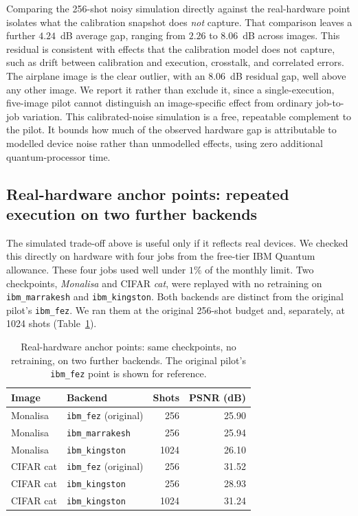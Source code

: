 \documentclass[pdflatex,sn-basic]{sn-jnl}
\begin{document}
Comparing the 256-shot noisy simulation directly against the real-hardware point isolates what the calibration snapshot does \emph{not} capture.
That comparison leaves a further $4.24$~dB average gap, ranging from $2.26$ to $8.06$~dB across images.
This residual is consistent with effects that the calibration model does not capture, such as drift between calibration and execution, crosstalk, and correlated errors.
The airplane image is the clear outlier, with an $8.06$~dB residual gap, well above any other image.
We report it rather than exclude it, since a single-execution, five-image pilot cannot distinguish an image-specific effect from ordinary job-to-job variation.
This calibrated-noise simulation is a free, repeatable complement to the pilot.
It bounds how much of the observed hardware gap is attributable to modelled device noise rather than unmodelled effects, using zero additional quantum-processor time.

\subsection{Real-hardware anchor points: repeated execution on two further backends}
\label{sec:hardware_anchors}

The simulated trade-off above is useful only if it reflects real devices.
We checked this directly on hardware with four jobs from the free-tier IBM Quantum allowance.
These four jobs used well under $1\%$ of the monthly limit.
Two checkpoints, \textit{Monalisa} and CIFAR \textit{cat}, were replayed with no retraining on \texttt{ibm\_marrakesh} and \texttt{ibm\_kingston}.
Both backends are distinct from the original pilot's \texttt{ibm\_fez}.
We ran them at the original 256-shot budget and, separately, at 1024 shots (Table~\ref{tab:hardware_anchors}).

\begin{table}[t]
  \centering
  \caption{Real-hardware anchor points: same checkpoints, no retraining, on two further backends.
  The original pilot's \texttt{ibm\_fez} point is shown for reference.}
  \label{tab:hardware_anchors}
  \begin{tabular}{@{}l l r r@{}}
    \toprule
    Image       & Backend                       & Shots & PSNR (dB) \\
    \midrule
    Monalisa    & \texttt{ibm\_fez} (original)  &  256  & 25.90     \\
    Monalisa    & \texttt{ibm\_marrakesh}       &  256  & 25.94     \\
    Monalisa    & \texttt{ibm\_kingston}        & 1024  & 26.10     \\
    \addlinespace
    CIFAR cat   & \texttt{ibm\_fez} (original)  &  256  & 31.52     \\
    CIFAR cat   & \texttt{ibm\_kingston}        &  256  & 28.93     \\
    CIFAR cat   & \texttt{ibm\_kingston}        & 1024  & 31.24     \\
    \bottomrule
  \end{tabular}
\end{table}
\end{document}
